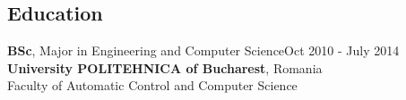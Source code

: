 \documentclass[line, margin]{resume}
\begin{document}
\begin{resume}
    \section{Education}


    \textbf{BSc}, Major in Engineering and Computer Science\hfill Oct 2010 - July 2014\\
    \textbf{University POLITEHNICA of Bucharest}, Romania\\
    Faculty of Automatic Control and Computer Science

%

\end{resume}
\end{document}
